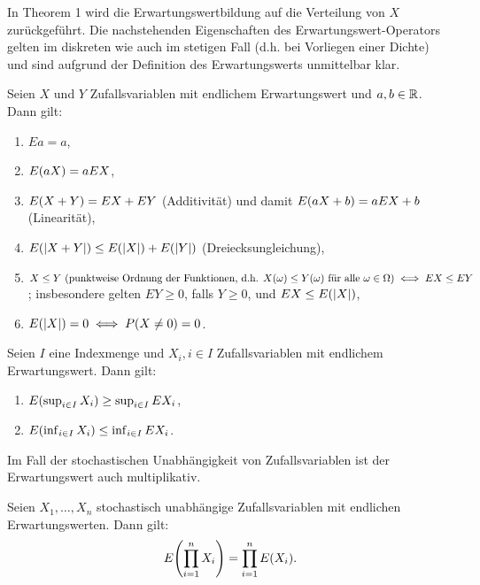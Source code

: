 \documentclass{lecture}
\begin{document}
    In Theorem 1 wird die Erwartungswertbildung auf die Verteilung von \(X\) zurückgeführt.
    Die nachstehenden Eigenschaften des Erwartungswert-Operators gelten im diskreten wie auch im stetigen Fall (d.h. bei Vorliegen einer Dichte) und sind aufgrund der Definition des Erwartungswerts unmittelbar klar.
    
    \begin{lemma}
        Seien \(X\) und \(Y\) Zufallsvariablen mit endlichem Erwartungswert und \(a, b \in \mathbb{R}\).
        Dann gilt:
        \begin{enumerate}
            \item \(Ea = a\),
            \item \(E\parentheses*{aX} = aEX\),
            \item \(E\parentheses*{X + Y} = EX + EY\) (Additivität) und damit \(E\parentheses*{aX + b} = aEX + b\) (Linearität),
            \item \(E\parentheses*{\absolute*{X + Y}} \le E\parentheses*{\absolute*{X}} + E\parentheses*{\absolute*{Y}}\) (Dreiecksungleichung),
            \item \(X \le Y\text{ (punktweise Ordnung der Funktionen, d.h. }X\parentheses*{\omega} \le Y\parentheses*{\omega}\text{ für alle }\omega \in \Omega\text{)} \iff EX \le EY\);
            insbesondere gelten \(EY \ge 0\), falls \(Y \ge 0\), und \(EX \le E\parentheses*{\absolute*{X}}\),
            \item \(E\parentheses*{\absolute*{X}} = 0 \iff P\parentheses*{X \ne 0} = 0\).
        \end{enumerate}
    \end{lemma}
    
    \begin{lemma}
        Seien \(I\) eine Indexmenge und \(X_i, i \in I\) Zufallsvariablen mit endlichem Erwartungswert.
        Dann gilt:
        \begin{enumerate}
            \item \(E\parentheses*{\sup_{i \in I}X_i} \ge \sup_{i \in I}EX_i\),
            \item \(E\parentheses*{\inf_{i \in I}X_i} \le \inf_{i \in I}EX_i\).
        \end{enumerate}
    \end{lemma}
    
    Im Fall der stochastischen Unabhängigkeit von Zufallsvariablen ist der Erwartungswert auch multiplikativ.
    
    \begin{theorem}
        Seien \(X_1, \ldots, X_n\) stochastisch unabhängige Zufallsvariablen mit endlichen Erwartungswerten.
        Dann gilt:
        \[
            E\parentheses*{\prod_{i = 1}^n X_i} = \prod_{i = 1}^n E\parentheses*{X_i}.
        \]
    \end{theorem}
    
\end{document}
